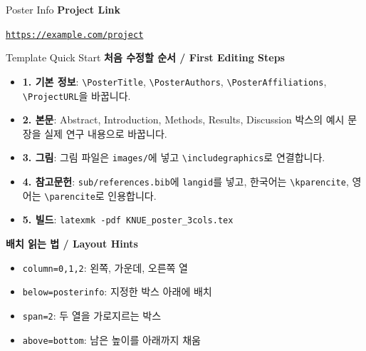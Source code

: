 \documentclass[a0paper,portrait]{KNUE_baposter}
\newcommand{\ProjectURL}{https://example.com/project}
\begin{document}
\begin{poster}
\begin{posterbox}[name=posterinfo,column=2,row=0]{Poster Info}
\vspace{0.6em}
\footnotesize
\textbf{Project Link}

\scriptsize
\href{\ProjectURL}{\nolinkurl{\ProjectURL}}
\end{posterbox}

%
\begin{posterbox}[name=boxlayoutguide,column=2,below=posterinfo]{Template Quick Start}
\tiny
\textbf{처음 수정할 순서 / First Editing Steps}

\begin{itemize}
\item \textbf{1. 기본 정보}: \texttt{\textbackslash PosterTitle}, \texttt{\textbackslash PosterAuthors}, \texttt{\textbackslash PosterAffiliations}, \texttt{\textbackslash ProjectURL}을 바꿉니다.
\item \textbf{2. 본문}: Abstract, Introduction, Methods, Results, Discussion 박스의 예시 문장을 실제 연구 내용으로 바꿉니다.
\item \textbf{3. 그림}: 그림 파일은 \texttt{images/}에 넣고 \texttt{\textbackslash includegraphics}로 연결합니다.
\item \textbf{4. 참고문헌}: \texttt{sub/references.bib}에 \texttt{langid}를 넣고, 한국어는 \texttt{\textbackslash kparencite}, 영어는 \texttt{\textbackslash parencite}로 인용합니다.
\item \textbf{5. 빌드}: \texttt{latexmk -pdf KNUE\_poster\_3cols.tex}
\end{itemize}

\vspace{0.25em}
\textbf{배치 읽는 법 / Layout Hints}

\begin{itemize}
\item \texttt{column=0,1,2}: 왼쪽, 가운데, 오른쪽 열
\item \texttt{below=posterinfo}: 지정한 박스 아래에 배치
\item \texttt{span=2}: 두 열을 가로지르는 박스
\item \texttt{above=bottom}: 남은 높이를 아래까지 채움
\end{itemize}


\end{posterbox}
\end{poster}
\end{document}
